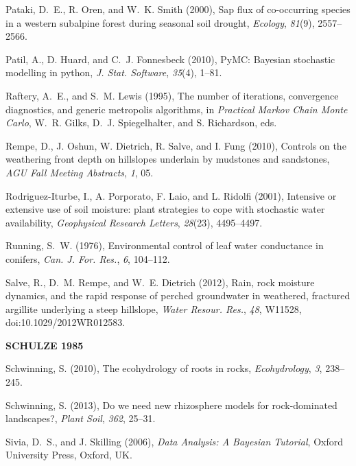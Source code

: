 Pataki, D.~E., R. Oren, and W.~K. Smith (2000), Sap flux of co-occurring species in a western subalpine forest during seasonal soil drought, 
\textit{Ecology}, \textit{81}(9), 2557--2566.

Patil, A., D. Huard, and C.~J. Fonnesbeck (2010), PyMC: Bayesian stochastic modelling in python,
\textit{J. Stat. Software}, \textit{35}(4), 1--81.

Raftery, A.~E., and S.~M. Lewis (1995), The number of iterations, convergence diagnostics, and generic metropolis algorithms, in \textit{Practical Markov Chain Monte Carlo}, W.~R. Gilks, D.~J. Spiegelhalter, and S. Richardson, eds.

Rempe, D., J. Oshun, W. Dietrich, R. Salve, and I. Fung (2010), Controls on the weathering front
depth on hillslopes underlain by mudstones and sandstones, \textit{AGU Fall Meeting Abstracts}, \textit{1},
05.

Rodriguez-Iturbe, I., A. Porporato, F. Laio, and L. Ridolfi (2001), Intensive or extensive use of soil moisture: plant strategies to cope with stochastic water availability, 
\textit{Geophysical Research Letters}, \textit{28}(23), 4495--4497.

Running, S.~W. (1976), Environmental control of leaf water conductance in conifers, 
\textit{Can. J. For. Res.}, \textit{6}, 104--112.

Salve, R., D.~M. Rempe, and W.~E. Dietrich (2012), Rain, rock moisture dynamics, and the rapid response of perched groundwater in weathered, fractured argillite underlying a steep hillslope, 
\textit{Water Resour. Res.}, \textit{48}, W11528, doi:10.1029/2012WR012583.

\textbf{SCHULZE 1985}

Schwinning, S. (2010), The ecohydrology of roots in rocks,
\textit{Ecohydrology}, \textit{3}, 238--245.

Schwinning, S. (2013), Do we need new rhizosphere models for rock-dominated landscapes?,
\textit{Plant Soil}, \textit{362}, 25--31.

Sivia, D.~S., and J. Skilling (2006), \textit{Data Analysis: A Bayesian Tutorial}, Oxford University Press, Oxford, UK.

